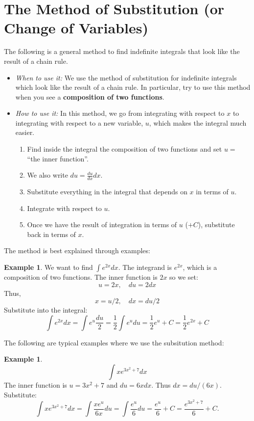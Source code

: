 \documentclass[12pt]{article}
\theoremstyle{definition}
\newtheorem{exa}[thm]{Example}
\begin{document}
\section*{The Method of Substitution (or Change of Variables)}

The following is a general method to find indefinite integrals
that look like the result of a chain rule.

\begin{itemize}
\item {\it When to use it:} We use the method of substitution for indefinite integrals which look like the result of
a chain rule. In particular, try to use this method when you see a {\bf composition of two functions}.

\item {\it How to use it:} In this method, we go from integrating with respect to $x$ to integrating with respect to
a new variable, $u$, which makes the integral much easier.
\begin{enumerate}
\item Find inside the integral the composition of two functions and set $u=$ ``the inner function''.
\item We also write $du=\frac{du}{dx}dx$.
\item Substitute everything in the integral that depends on $x$ in terms of $u$.
\item Integrate with respect to $u$.
\item Once we have the result of integration in terms of $u$ ($+ C$), substitute back in terms of $x$.
\end{enumerate}
\end{itemize}

The method is best explained through examples:

\begin{exa}
We want to find $\int e^{2x} dx $. The integrand is $e^{2x}$, which is a composition of two functions.
The inner function is $2x$ so we set:
$$u=2x,\quad du=2dx$$
Thus,
$$x=u/2,\quad dx=du/2$$
Substitute into the integral:
$$\int e^{2x}dx= \int e^u \frac{du}{2}=\frac{1}{2}\int e^u du = \frac{1}{2} e^u +C=\frac{1}{2}e^{2x} + C$$
\end{exa}

The following are typical examples where we use the subsitution method:

\begin{exa}
$$\int xe^{3x^2+7} dx$$ The inner function is $u=3x^2+7$ and $du=6x dx$. Thus $dx=du/(6x)$. Substitute:
$$\int xe^{3x^2+7}dx = \int \frac{x e^u }{6x}du =\int \frac{e^u}{6} du = \frac{e^u}{6} +C = \frac{e^{3x^2+7}}{6} +C.$$
\end{exa}
\end{document}
